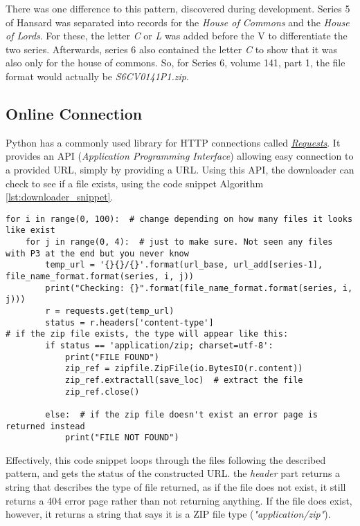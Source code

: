 There was one difference to this pattern, discovered during development. Series 5 of Hansard was separated into records for the \emph{House of Commons} and the \emph{House of Lords}. For these, the letter \emph{C} or \emph{L} was added before the V to differentiate the two series. Afterwards, series 6 also contained the letter \emph{C} to show that it was also only for the house of commons. So, for Series 6, volume 141, part 1, the file format would actually be \emph{S6CV0141P1.zip}.

\subsection{Online Connection}
\label{sec:imp_online_connect}
Python has a commonly used library for HTTP connections called \href{http://docs.python-requests.org/en/master/}{\emph{Requests}}. It provides an API (\emph{Application Programming Interface}) allowing easy connection to a provided URL, simply by providing a URL. Using this API, the downloader can check to see if a file exists, using the code snippet Algorithm \ref{lst:downloader_snippet}.

\begin{lstlisting}[float=ht,
				   caption={Snippet of the Downloader Code},
				   label={lst:downloader_snippet}]
for i in range(0, 100):  # change depending on how many files it looks like exist
    for j in range(0, 4):  # just to make sure. Not seen any files with P3 at the end but you never know
        temp_url = '{}{}/{}'.format(url_base, url_add[series-1], file_name_format.format(series, i, j))
        print("Checking: {}".format(file_name_format.format(series, i, j)))
        r = requests.get(temp_url)
        status = r.headers['content-type']
# if the zip file exists, the type will appear like this:
        if status == 'application/zip; charset=utf-8':  
            print("FILE FOUND")
            zip_ref = zipfile.ZipFile(io.BytesIO(r.content))
            zip_ref.extractall(save_loc)  # extract the file
            zip_ref.close()

        else:  # if the zip file doesn't exist an error page is returned instead
            print("FILE NOT FOUND")
\end{lstlisting}

Effectively, this code snippet loops through the files following the described pattern, and gets the status of the constructed URL. the \emph{header} part returns a string that describes the type of file returned, as if the file does not exist, it still returns a 404 error page rather than not returning anything. If the file does exist, however, it returns a string that says it is a ZIP file type (\emph{"application/zip"}).

